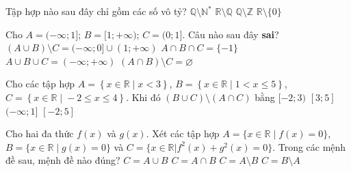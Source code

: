 \begin{ex}%
	Tập hợp nào sau  đây chỉ gồm các số vô tỷ?
	\choice 
		{$\mathbb{Q}\setminus \mathbb{N}^*$} 
		{\True $\mathbb{R}\setminus  \mathbb{Q}$}
		{$\mathbb{Q}\setminus  \mathbb{Z}$}
		 {$\mathbb{R}\setminus \{0\}$}
\end{ex}

\begin{ex}%
	Cho $A=(-\infty;1]$; $B=[1;+\infty)$; $C=(0;1]$. Câu nào sau đây  \textbf{sai}?
	 \choice
		{$\left(A\cup B\right)\setminus C=(-\infty;0]\cup  (1;+\infty)$}
		 {\True $A\cap B\cap C=\{-1\}$}
		{$A\cup  B\cup C=(-\infty;+\infty)$}
		{$\left(A\cap B\right)\setminus C=\varnothing  $}
\end{ex}

\begin{ex}%
	Cho các tập hợp $A=\left\{x\in \mathbb{R}\;|\;x<3\right\}$, $B=\left\{x\in \mathbb{R}\;|\;1<x\leqslant 5\right\}$,\\ $C=\left\{x\in \mathbb{R}\;|\;-2\leqslant x\leqslant 4\right\}$. Khi  đó $\left(B\cup C\right)\setminus \left(A\cap C\right)$ bằng
	 \choice
		 {$[-2;3)$}
		{\True $[3;5]$} 
		 {$(-\infty;1]$}
		 {$[-2;5]$}
	 \loigiai{
		 $A=(-\infty;3)$, $B=(1;5]$, $C=[-2;4]$.\\
	\[\left(B\cup C\right)\setminus \left(A\cap  C\right)=\left\{(1;5]\cup [-2;4]\right\}\setminus \left\{(-\infty;3)\cap [-2;4]\right\}=[-2;5]\setminus [-2;3)=[3;5].\]}
\end{ex}

\begin{ex}%
	Cho hai đa thức $f(x)$ và $g(x)$. Xét các tập hợp $A=\{x\in\mathbb{R}\;\big|\;f(x)=0\}$, $B=\{x\in\mathbb{R}\;\big|\;g(x)=0\}$ và $C=\{x\in\mathbb{R}|f^2(x)+g^2(x)=0\}$. Trong các mệnh đề sau, mệnh đề nào  đúng?
	 \choice
		{$C=A\cup  B$}
		{\True  $C=A\cap B$}
		{$C=A\setminus B$} 
		{$C=B\setminus A$} 
\end{ex}

